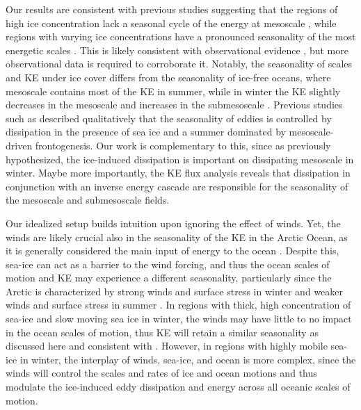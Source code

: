 \documentclass[draft]{agujournal2019}
\begin{document}
Our results are consistent with previous studies suggesting that the regions of high ice concentration lack a seasonal cycle of the energy at mesoscale \citep{Mensa_seasonal_2017}, while regions with varying ice concentrations have a pronounced seasonality of the most energetic scales \citep{Manucharyan_eddies_2022, Liu_seasonal_2024}. This is likely consistent with observational evidence \citep{Cassianides_eddies_2023}, but more observational data is required to corroborate it. Notably, the seasonality of scales and KE under ice cover differs from the seasonality of ice-free oceans, where mesoscale contains most of the KE in summer, while in winter the KE slightly decreases in the mesoscale and increases in the submesoscale \citep{Callies_seasonality_2015}. Previous studies such as \citet{Manucharyan_eddies_2022} described qualitatively that the seasonality of eddies is controlled by dissipation in the presence of sea ice and a summer dominated by mesoscale-driven frontogenesis. Our work is complementary to this, since as previously hypothesized, the ice-induced dissipation is important on dissipating mesoscale in winter. Maybe more importantly, the KE flux analysis reveals that dissipation in conjunction with an inverse energy cascade are responsible for the seasonality of the mesoscale and submesoscale fields.

Our idealized setup builds intuition upon ignoring the effect of winds. Yet, the winds are likely crucial also in the seasonality of the KE in the Arctic Ocean, as it is generally considered the main input of energy to the ocean \citep{Ferrari_KE_2009}. Despite this, sea-ice can act as a barrier to the wind forcing, and thus the ocean scales of motion and KE may experience a different seasonality, particularly since the Arctic is characterized by strong winds and surface stress in winter and weaker winds and surface stress in summer \citep{Hughes_winds_2015, Martin_stress_2014}. In regions with thick, high concentration of sea-ice and slow moving sea ice in winter, the winds may have little to no impact in the ocean scales of motion, thus KE will retain a similar seasonality as discussed here and consistent with \citet{Manucharyan_eddies_2022}. However, in regions with highly mobile sea-ice in winter, the interplay of winds, sea-ice, and ocean is more complex, since the winds will control the scales and rates of ice and ocean motions and thus modulate the ice-induced eddy dissipation and energy across all oceanic scales of motion.
\end{document}
